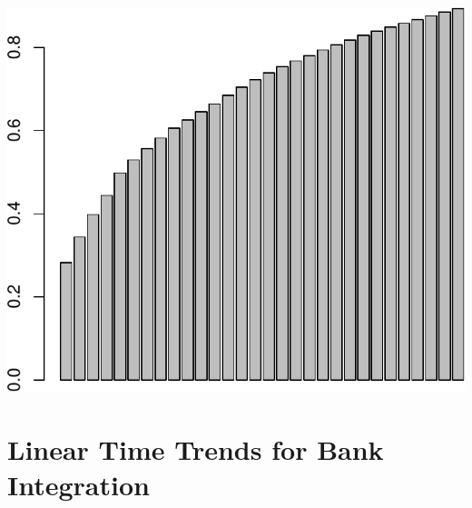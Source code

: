 \documentclass[11pt,]{article}
\begin{document}
\begin{center}\includegraphics{AC_US_Bank_Int_Results_1_files/figure-latex/expl_power_eig_vec-2} \end{center}

\section{Linear Time Trends for Bank
Integration}\label{linear-time-trends-for-bank-integration}
\end{document}

